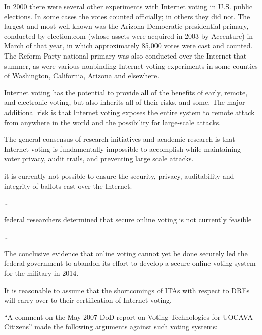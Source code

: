 \begin{displayquote}
   In 2000 there were several other experiments with Internet voting in U.S.
   public elections. In some cases the votes counted officially; in others they
   did not. The largest and most well-known was the Arizona Democratic
   presidential primary, conducted by election.com (whose assets were acquired
   in 2003 by Accenture) in March of that year, in which approximately 85,000
   votes were cast and counted. The Reform Party national primary was also
   conducted over the Internet that summer, as were various nonbinding Internet
   voting experiments in some counties of Washington, California, Arizona and
   elsewhere.
\end{displayquote}

Internet voting has the potential to provide all of the benefits of early,
remote, and electronic voting, but also inherits all of their risks, and some.
The major additional risk is that Internet voting exposes the entire system to
remote attack from anywhere in the world and the possibility for large-scale
attacks.

The general consensus of research initiatives and academic research is that
Internet voting is fundamentally impossible to accomplish while maintaining
voter privacy, audit trails, and preventing large scale attacks.

\begin{displayquote}
   it is currently not possible to ensure the security, privacy, auditability
   and integrity of ballots cast over the Internet.

   \dots

   federal researchers determined that secure online voting is not currently
   feasible

   \dots

   The conclusive evidence that online voting cannot yet be done securely led
   the federal government to abandon its effort to develop a secure online
   voting system for the military in 2014.
\end{displayquote}

\begin{displayquote}
   It is reasonable to assume that the shortcomings of ITAs with respect to DREs
   will carry over to their certification of Internet voting.
\end{displayquote}

``A comment on the May 2007 DoD report on Voting Technologies for UOCAVA
Citizens'' made the following arguments against such voting systems:

